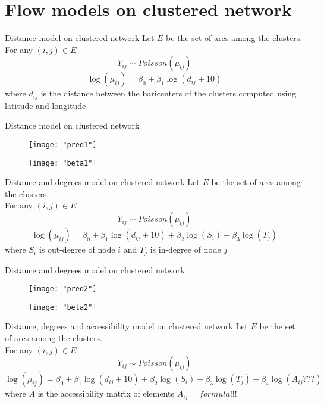 \documentclass[pdf]{beamer}
\begin{document}
\section{Flow models on clustered network}

\begin{frame}{Distance model on clustered network}
Let $E$ be the set of arcs among the clusters.\\[0.2cm]
For any $(i,j) \in E$
\[Y_{ij} \sim Poisson(\mu_{ij})\]
\[\log(\mu_{ij}) = \beta_0 + \beta_1 \log(d_{ij}+10)\]
where $d_{ij}$ is the distance between the baricenters of the clusters computed using latitude and longitude
\end{frame} 

\begin{frame}{Distance model on clustered network}
\begin{figure}
	\centering
	\texttt{[image: "pred1"]}
	\label{fig:bikesianmibellissimo-s-e-a-modificate}
\end{figure}
\begin{figure}
	\centering
	\texttt{[image: "beta1"]}
	\label{fig:bikesianmibellissimo-s-e-a-modificate}
\end{figure}
\end{frame}

\begin{frame}{Distance and degrees model on clustered network}
Let $E$ be the set of arcs among the clusters.\\[0.2cm]
For any $(i,j) \in E$
\[Y_{ij} \sim Poisson(\mu_{ij})\]
\[\log(\mu_{ij}) = \beta_0 + \beta_1 \log(d_{ij}+10) + \beta_2 \log(S_{i}) + \beta_3 \log(T_{j})\]
where $S_{i}$ is out-degree of node $i$ and $T_{j}$ is in-degree of node $j$
\end{frame}

\begin{frame}{Distance and degrees model on clustered network}
\begin{figure}
	\centering
	\texttt{[image: "pred2"]}
	\label{fig:bikesianmibellissimo-s-e-a-modificate}
\end{figure}
\begin{figure}
	\centering
	\texttt{[image: "beta2"]}
	\label{fig:bikesianmibellissimo-s-e-a-modificate}
\end{figure}
\end{frame}

\begin{frame}{Distance, degrees and accessibility model on clustered network}
Let $E$ be the set of arcs among the clusters.\\[0.2cm]
For any $(i,j) \in E$
\[Y_{ij} \sim Poisson(\mu_{ij})\]
\[\log(\mu_{ij}) = \beta_0 + \beta_1 \log(d_{ij}+10) + \beta_2 \log(S_{i}) + \beta_3 \log(T_{j}) + \beta_4 \log(A_{ij}???)\]
where $A$ is the accessibility matrix of elements $A_{ij}=formula!!!$
\end{frame}
\end{document}
